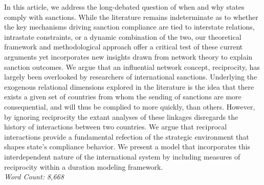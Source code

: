 In this article, we address the long-debated question of when and why states comply with sanctions. While the literature remains indeterminate as to whether the key mechanisms driving sanction compliance are tied to interstate relations, intrastate constraints, or a dynamic combination of the two, our theoretical framework and methodological approach offer a critical test of these current arguments yet incorporates new insights drawn from network theory to explain sanction outcomes. We argue that an influential network concept, reciprocity, has largely been overlooked by researchers of international sanctions. Underlying the exogenous
relational dimensions explored in the literature is the idea that there exists a given set of countries from whom the sending of sanctions are more consequential, and will thus be complied to more quickly, than others. However, by ignoring reciprocity the extant analyses of these linkages disregards the history of interactions between two countries. We argue that reciprocal interactions provide a fundamental refection of the strategic environment that shapes state's compliance behavior. We present a model that incorporates this interdependent nature of the international system by including measures of reciprocity within a duration modeling framework.\\

\noindent \textit{Word Count: 8,668}

